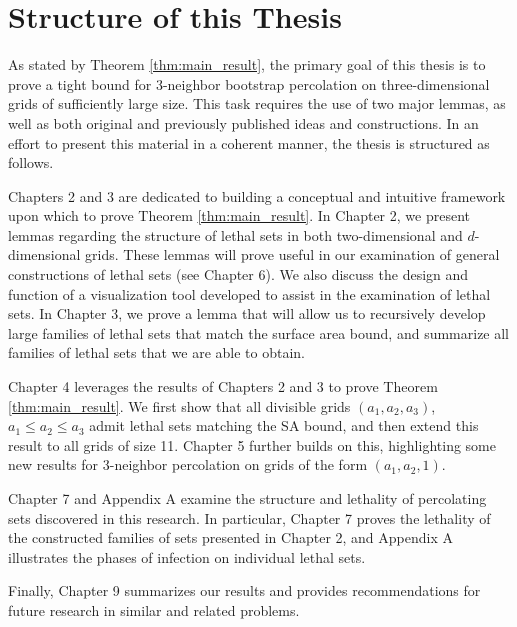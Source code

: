 
\section{Structure of this Thesis}

As stated by Theorem \ref{thm:main_result}, the primary goal of this thesis is to prove a tight bound for 3-neighbor bootstrap percolation on three-dimensional grids of sufficiently large size. This task requires the use of two major lemmas, as well as both original and previously published ideas and constructions. In an effort to present this material in a coherent manner, the thesis is structured as follows. 

Chapters 2 and 3 are dedicated to building a conceptual and intuitive framework upon which to prove Theorem \ref{thm:main_result}. In Chapter 2, we present lemmas regarding the structure of lethal sets in both two-dimensional and $d$-dimensional grids. These lemmas will prove useful in our examination of general constructions of lethal sets (see Chapter 6). We also discuss the design and function of a visualization tool developed to assist in the examination of lethal sets. In Chapter 3, we prove a lemma that will allow us to recursively develop large families of lethal sets that match the surface area bound, and summarize all families of lethal sets that we are able to obtain. 

Chapter 4 leverages the results of Chapters 2 and 3 to prove Theorem \ref{thm:main_result}. We first show that all divisible grids $(a_1,a_2,a_3)$, $a_1 \leq a_2 \leq a_3$ admit lethal sets matching the SA bound, and then extend this result to all grids of size 11. Chapter 5 further builds on this, highlighting some new results for 3-neighbor percolation on grids of the form $(a_1,a_2,1)$.

Chapter 7 and Appendix A examine the structure and lethality of percolating sets discovered in this research. In particular, Chapter 7 proves the lethality of the constructed families of sets presented in Chapter 2, and Appendix A illustrates the phases of infection on individual lethal sets.

Finally, Chapter 9 summarizes our results and provides recommendations for future research in similar and related problems. 


